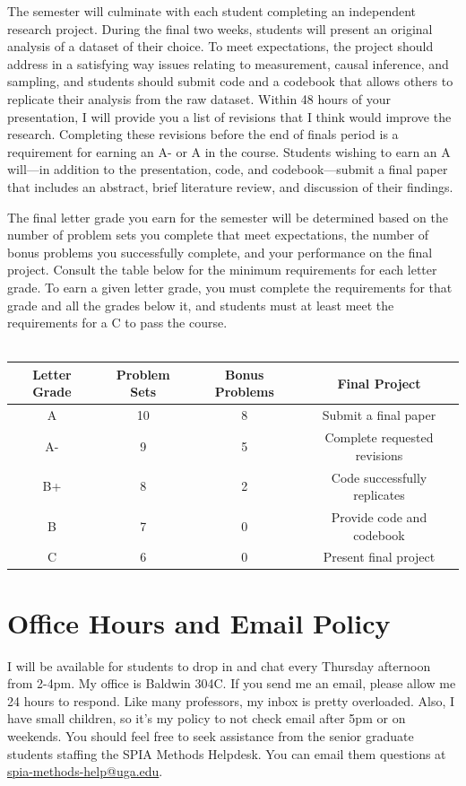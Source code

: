 \documentclass[11pt, letterpaper]{article}
\begin{document}
The semester will culminate with each student completing an independent research project. During the final two weeks, students will present an original analysis of a dataset of their choice. To meet expectations, the project should address in a satisfying way issues relating to measurement, causal inference, and sampling, and students should submit code and a codebook that allows others to replicate their analysis from the raw dataset. Within 48 hours of your presentation, I will provide you a list of revisions that I think would improve the research. Completing these revisions before the end of finals period is a requirement for earning an A- or A in the course. Students wishing to earn an A will---in addition to the presentation, code, and codebook---submit a final paper that includes an abstract, brief literature review, and discussion of their findings.

The final letter grade you earn for the semester will be determined based on the number of problem sets you complete that meet expectations, the number of bonus problems you successfully complete, and your performance on the final project. Consult the table below for the minimum requirements for each letter grade. To earn a given letter grade, you must complete the requirements for that grade and all the grades below it, and students must at least meet the requirements for a C to pass the course.\\\\
\begin{tabular}{|c|c|c|c|}
	\hline
	Letter Grade & Problem Sets & Bonus Problems & Final Project \\
	\hline
	A & 10 & 8 & Submit a final paper \\
	\hline
	A- & 9 & 5 & Complete requested revisions \\
	\hline
	B+ & 8 & 2 & Code successfully replicates \\
	\hline
	B & 7 & 0 & Provide code and codebook \\
	\hline
	C & 6 & 0 & Present final project \\
	\hline
\end{tabular} 

\section*{Office Hours and Email Policy}
I will be available for students to drop in and chat every Thursday afternoon from 2-4pm. My office is Baldwin 304C. If you send me an email, please allow me 24 hours to respond. Like many professors, my inbox is pretty overloaded. Also, I have small children, so it's my policy to not check email after 5pm or on weekends. You should feel free to seek assistance from the senior graduate students staffing the SPIA Methods Helpdesk. You can email them questions at \href{mailto:spia-methods-help@uga.edu}{spia-methods-help@uga.edu}.
\end{document}
